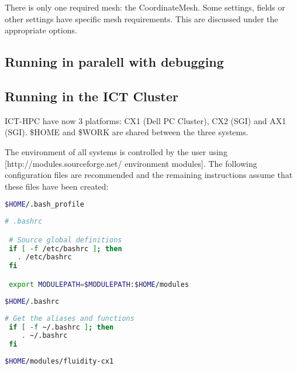 There is only one required mesh: the CoordinateMesh. Some settings, fields or other
settings have specific mesh requirements. This are discussed under the appropriate options.

\subsection{Running in paralell with debugging}

\subsection{Running in the ICT Cluster}

ICT-HPC have now 3 platforms: CX1 (Dell PC Cluster), CX2 (SGI) and AX1 (SGI). \$HOME and \$WORK are shared between the three systems.

The environment of all systems is controlled by the user using [http://modules.sourceforge.net/ environment modules]. The following configuration files are recommended and the remaining instructions assume that these files have been created:

\begin{lstlisting}[language=bash]
$HOME/.bash_profile
\end{lstlisting}

\begin{lstlisting}[language=bash]
 # .bashrc

 # Source global definitions
 if [ -f /etc/bashrc ]; then
   . /etc/bashrc
 fi

 export MODULEPATH=$MODULEPATH:$HOME/modules
\end{lstlisting}

\begin{lstlisting}[language=bash]
$HOME/.bashrc
\end{lstlisting}

\begin{lstlisting}[language=bash]
 # Get the aliases and functions
 if [ -f ~/.bashrc ]; then
 	. ~/.bashrc
 fi
\end{lstlisting}


\begin{lstlisting}[language=bash]
$HOME/modules/fluidity-cx1
\end{lstlisting}
